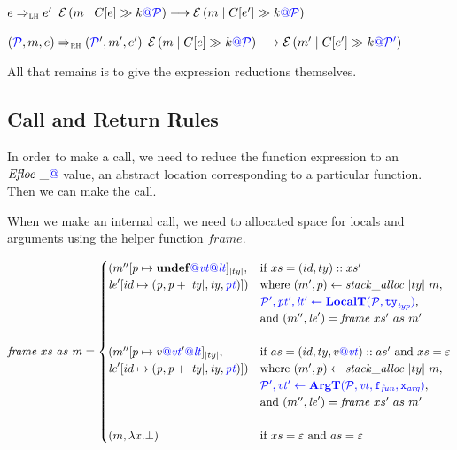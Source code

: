 \documentclass{llncs}
\begin{document}

\judgmenttwo{\(\ctx{\expr}_\lh\)}
            {\(\expr \Rightarrow_\lh \expr'\)}
            {\(\defestate{\ctx{\expr}} \longrightarrow \defestate{\ctx{\expr'}}\)}

\judgmenttwo{\(\ctx{\expr}_\rh\)}
            {\((\PCT, \mem, \expr) \Rightarrow_\rh (\PCT', \mem', \expr')\)}
            {\(\defestate{\ctx{\expr}} \longrightarrow \estate{\PCT'}{\mem'}{\ctx{\expr'}}{\cont}\)}
            
All that remains is to give the expression reductions themselves.

\expressions

\subsection{Call and Return Rules}

In order to make a call, we need to reduce the function expression to an \(\floc{\_}\) value, an
abstract location corresponding to a particular function. Then we can make the call.

\callexprstep

When we make an internal call, we need to allocated space for locals and arguments using the helper function
\(\mathit{frame}\).

\[\mathit{frame} ~ xs ~ as ~ \mem =
\begin{cases}
  (\mem''[p \mapsto \vundef\tagat\vt\tagat\lt]_{|ty|}, & \textnormal{if } xs = (id,ty)::xs' \\
  \lenv'[id \mapsto (\mathit{p, p+|ty|,ty,\pt})]) &
  \textnormal{where } (\mem',p) \leftarrow \mathit{stack\_alloc} ~ |ty| ~ \mem, \\
  & \trule{\localtres}{\localt}, \\
  & \textnormal{and } (\mem'',\lenv') = \mathit{frame} ~ xs' ~ as ~ m' \\ 
  \\
  (\mem''[p \mapsto v\tagat\vt'\tagat\lt]_{|ty|}, & \textnormal{if } as = (id,ty,v \tagat \vt)::as' \textnormal{ and } xs = \varepsilon \\
  \lenv'[id \mapsto (\mathit{p, p+|ty|,ty,\pt})]) &
  \textnormal{where } (\mem',p) \leftarrow \mathit{stack\_alloc} ~ |ty| ~ \mem, \\
  & \trule{\argtres}{\argt}, \\
  & \textnormal{and } (\mem'',\lenv') = \mathit{frame} ~ xs' ~ as ~ m' \\
  \\
  (\mem, \lambda x . \bot) & \textnormal{if } xs = \varepsilon \textnormal{ and } as = \varepsilon \\
\end{cases}\]
\end{document}
